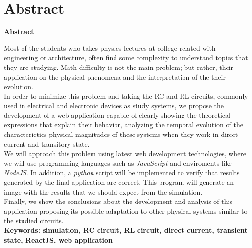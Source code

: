 \documentclass[../main.tex]{subfiles}
\begin{document}
\makeatletter
\renewenvironment{abstract}{%
    \if@twocolumn
      \section*{Abstract \\}%
    \else %
    \begin{flushright}
        {\filleft\Huge\bfseries\fontsize{48pt}{12}\selectfont Abstract\vspace{\z@}}%
        \end{flushright}
      \quotation
    \fi}
    {\if@twocolumn\else\endquotation\fi}
\makeatother
\begin{abstract}

Most of the students who takes physics lectures at college related with engineering or architecture, often find some complexity to understand topics that they are studying. Math difficulty is not the main problem; but rather, their application on the physical phenomena and the interpretation of the their evolution.\\

In order to minimize this problem and taking the RC and RL circuits, commonly used in electrical and electronic devices as study systems, we propose the development of a web application capable of clearly showing the theoretical expressions that explain their behavior, analyzing the temporal evolution of the characterictics physical magnitudes of these systems when they work in direct current and transitory state. \\

We will approach this problem using latest web development technologies, where we will use programming languages such as \textit{JavaScript} and enviroments like \textit{NodeJS}. In addition, a \textit{python} script will be implemented to verify that results generated by the final  application are correct. This program will generate an image with the results that we should expect from the simulation.\\ 

Finally, we show the conclusions about the development and analysis of this application proposing its possible adaptation to other physical systems similar to the studied circuits.\\



\bfseries{\large{Keywords:}} simulation, RC circuit, RL circuit, direct current, transient state, ReactJS, web application

\end{abstract}
\end{document}
